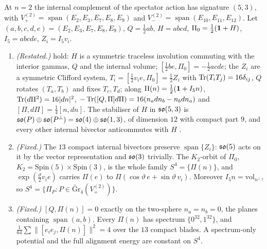 \begin{proposition}
\label{p1:prop:n2}
At $n=2$ the internal complement of the spectator action has signature $(5,3)$, with $V_+^{(2)}=\operatorname{span}(E_2,E_3,E_7,E_8,E_9)$ and
$V_-^{(2)}=\operatorname{span}(E_{10},E_{11},E_{12})$. Let $(a,b,c,d,e)=(E_2,E_3,E_7,E_8,E_9)$, $Q=\tfrac12ab$, $H=abcd$, $\Pi_0=\tfrac12(\mathbf 1+H)$, $I_5=abcde$, $Z_i=I_5v_i$.
\begin{enumerate}[label=(\roman*),leftmargin=2.2em]
\item \emph{(Restated.)} \cite[Thms.~26.6--26.8]{ES17} hold: $H$ is a symmetric traceless involution commuting with the interior gammas, $Q$ and the
internal volume; $[\tfrac12be,\Pi_0]=-\tfrac12acde$; the $Z_i$ are a symmetric Clifford system, $T_i=[\tfrac12v_ie,\Pi_0]=\tfrac12Z_i$ with $\operatorname{Tr}(T_iT_j)=16\delta_{ij}$, $Q$
rotates $(T_a,T_b)$ and fixes $T_c,T_d$; along $\Pi(n)=\tfrac12(\mathbf 1+I_5n)$, $\operatorname{Tr}(d\Pi^2)=16|dn|^2$, $-\operatorname{Tr}([Q,\Pi]d\Pi)=16(n_adn_b-n_bdn_a)$ and $[\Pi,d\Pi]=\tfrac14[n,dn]$.
The stabiliser of $H$ in $\mathfrak{so}(5,3)$ is $\mathfrak{so}(P)\oplus\mathfrak{so}(P^\perp)=\mathfrak{so}(4)\oplus\mathfrak{so}(1,3)$, of dimension $12$ with compact part $9$, and every other internal bivector
anticommutes with $H$ \cite[Prop.~26.9]{ES17}.
\item \emph{(Fixed.)} The $13$ compact internal bivectors preserve $\operatorname{span}\{Z_i\}$: $\mathfrak{so}(5)$ acts on it by the vector representation and $\mathfrak{so}(3)$
trivially. The $K_2$-orbit of $\Pi_0$, $K_2=\mathrm{Spin}(5)\times\mathrm{Spin}(3)$, is the whole family $S^4=\{\Pi(n)\}$, and
$\exp(\tfrac\vartheta2v_ie)$ carries $\Pi(e)$ to $\Pi(\cos\vartheta\,e+\sin\vartheta\,v_i)$. Moreover $I_5n=\mathrm{vol}_{n^\perp}$, so $S^4=\{\Pi_P:P\in\widetilde{\mathrm{Gr}}_4(V_+^{(2)})\}$.
\item \emph{(Fixed.)} $[Q,\Pi(n)]=0$ exactly on the two-sphere $n_a=n_b=0$, the planes containing $\operatorname{span}(a,b)$. Every $\Pi(n)$ has spectrum
$\{0^{32},1^{32}\}$, and $\tfrac1{64}\sum\|[e_ie_j,\Pi(n)]\|^2=4$ over the $13$ compact blades. A spectrum-only potential and the full alignment energy are
constant on $S^4$.
\end{enumerate}
\end{proposition}

